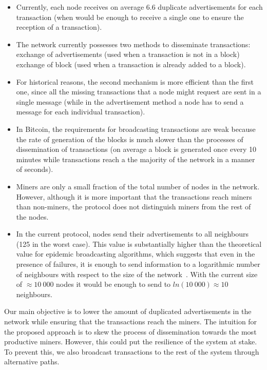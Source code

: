 \begin{itemize}
  \item Currently, each node receives on average 6.6 duplicate advertisements for each transaction (when would be enough to receive a single one to ensure the reception of a transaction).
  \item The network currently possesses two methods to disseminate transactions: exchange of advertisements (used when a transaction is not in a block) exchange of block (used when a transaction is already added to a block).
  \item For historical reasons, the second mechanism is more efficient than the first one, since all the missing transactions that a node might request are sent in a single message (while in the advertisement method a node has to send a message for each individual transaction).
  \item In Bitcoin, the requirements for broadcasting transactions are weak because the rate of generation of the blocks is much slower than the processes of dissemination of transactions (on average a block is generated once every 10 minutes while transactions reach a the majority of the network in a manner of seconds).
  \item Miners are only a small fraction of the total number of nodes in the network. However, although it is more important that the transactions reach miners than non-miners, the protocol does not distinguish miners from the rest of the nodes.
  \item In the current protocol, nodes send their advertisements to all  neighbours (125 in the worst case). This value is substantially higher than the theoretical value for epidemic broadcasting algorithms, which suggests that even in the presence of failures, it is enough to send information to a logarithmic number of neighbours with respect to the size of the network~\cite{epidemicDiss}. With the current size of $\approx 10~000$ nodes  it would be enough to send to $ ln(10~000) \approx 10$ neighbours.
\end{itemize}

Our main objective is to lower the amount of duplicated advertisements in the network while ensuring that the transactions reach the miners. The intuition for the proposed approach is to skew the process of dissemination towards the most productive miners. However, this could put the resilience of the system at stake. To prevent this, we also broadcast transactions to the rest of the system through alternative paths.


